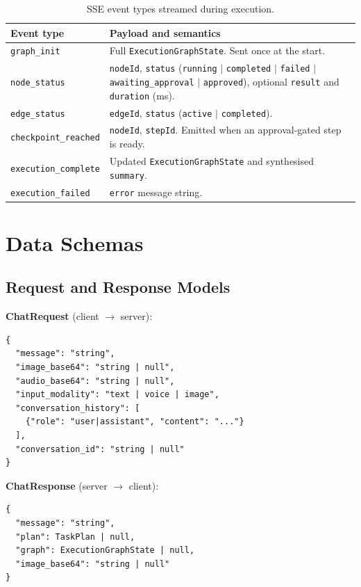 \documentclass[sigconf, anonymous]{acmart}
\begin{document}
\begin{table}[h]
  \caption{SSE event types streamed during execution.}
  \label{tab:sse}
  \small
  \begin{tabular}{p{} p{}}
    \toprule
    Event type & Payload and semantics \\
    \midrule
    \texttt{graph\_init} & Full \texttt{ExecutionGraphState}. Sent once at the start. \\
    \texttt{node\_status} & \texttt{nodeId}, \texttt{status} (\texttt{running} $|$ \texttt{completed} $|$ \texttt{failed} $|$ \texttt{awaiting\_approval} $|$ \texttt{approved}), optional \texttt{result} and \texttt{duration} (ms). \\
    \texttt{edge\_status} & \texttt{edgeId}, \texttt{status} (\texttt{active} $|$ \texttt{completed}). \\
    \texttt{checkpoint\_reached} & \texttt{nodeId}, \texttt{stepId}. Emitted when an approval-gated step is ready. \\
    \texttt{execution\_complete} & Updated \texttt{ExecutionGraphState} and synthesised \texttt{summary}. \\
    \texttt{execution\_failed} & \texttt{error} message string. \\
    \bottomrule
  \end{tabular}
\end{table}

\section{Data Schemas}
\label{app:schemas}

\subsection{Request and Response Models}

\textbf{ChatRequest} (client $\rightarrow$ server):
{\small
\begin{verbatim}
{
  "message": "string",
  "image_base64": "string | null",
  "audio_base64": "string | null",
  "input_modality": "text | voice | image",
  "conversation_history": [
    {"role": "user|assistant", "content": "..."}
  ],
  "conversation_id": "string | null"
}
\end{verbatim}
}

\textbf{ChatResponse} (server $\rightarrow$ client):
{\small
\begin{verbatim}
{
  "message": "string",
  "plan": TaskPlan | null,
  "graph": ExecutionGraphState | null,
  "image_base64": "string | null"
}
\end{verbatim}
}
\end{document}
